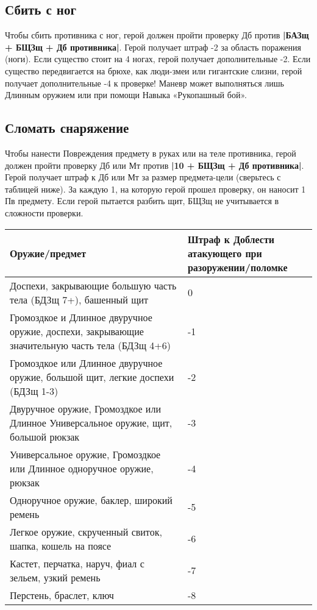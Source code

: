 \subsection{Сбить с ног}
Чтобы сбить противника с ног, герой должен пройти проверку Дб против \textbf{|БАЗщ + БЩЗщ + Дб противника|}.
\newline
Герой получает штраф -2 за область поражения (ноги). Если существо стоит на 4 ногах, герой получает дополнительные -2. Если существо передвигается на брюхе, как люди-змеи или гигантские слизни, герой получает дополнительные -4 к проверке! Маневр может выполняться лишь Длинным оружием или при помощи Навыка «Рукопашный бой».
\subsection{Сломать снаряжение}
Чтобы нанести Повреждения предмету в руках или на теле противника, герой должен пройти проверку Дб или Мт против \textbf{|10 + БЩЗщ + Дб противника|}.
\newline
Герой получает штраф к Дб или Мт за размер предмета-цели (сверьтесь с таблицей ниже). За каждую 1, на которую герой прошел проверку, он наносит 1 Пв предмету. Если герой пытается разбить щит, БЩЗщ не учитывается в сложности проверки. 
\begin{center}
\begin{tabular}{|p{10cm}|p{4cm}|}
\hline
Оружие/предмет & Штраф к Доблести атакующего при разоружении/поломке \\ \hline
Доспехи, закрывающие большую часть тела (БДЗщ 7+), башенный щит & 0 \\ \hline
Громоздкое и Длинное двуручное оружие, доспехи, закрывающие значительную часть тела (БДЗщ 4+6) & -1 \\ \hline
Громоздкое или Длинное двуручное оружие, большой щит, легкие доспехи (БДЗщ 1-3) & -2 \\ \hline
Двуручное оружие, Громоздкое или Длинное Универсальное оружие, щит, большой рюкзак & -3 \\ \hline
Универсальное оружие, Громоздкое или Длинное одноручное оружие, рюкзак & -4 \\ \hline
Одноручное оружие, баклер, широкий ремень & -5 \\ \hline
Легкое оружие, скрученный свиток, шапка, кошель на поясе & -6 \\ \hline
Кастет, перчатка, наруч, фиал с зельем, узкий ремень & -7 \\ \hline
Перстень, браслет, ключ & -8 \\ \hline
\end{tabular}
\end{center}

